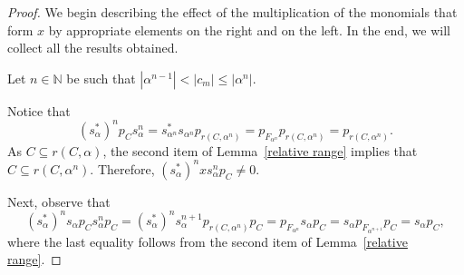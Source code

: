 \documentclass[a4paper,12pt]{amsart}
\theoremstyle{definition}
\theoremstyle{remark}
\numberwithin{equation}{section}
\newcommand{\N}{\mathbb{N}}
\begin{document}
\begin{proof}
We begin describing the effect of the multiplication of the monomials that form $x$ by appropriate elements on the right and on the left. In the end, we will collect all the results obtained. 

Let $n\in \N$ be such that $|\alpha^{n-1}|<|c_m|\leq |\alpha^n|$.

Notice that $$(s_\alpha^*)^np_C s_\alpha^n=s_{\alpha^n}^* s_{\alpha^n}p_{r(C,\alpha^n)}=p_{F_{\alpha^n}}p_{r(C,\alpha^n)}=p_{r(C,\alpha^n)}.$$ 
As $C\subseteq r(C,\alpha)$, the second item of Lemma~\ref{relative range} implies that $C\subseteq r(C,\alpha^n)$. Therefore, $(s_{\alpha}^*)^n xs_\alpha^n p_C \neq 0$.

Next, observe that 
$$(s_\alpha^*)^ns_\alpha p_C s_\alpha^n p_C=(s_\alpha^*)^ns_\alpha^{n+1}p_{r(C,\alpha^n)}p_C=p_{F_{\alpha^n}}s_{\alpha}p_C=s_\alpha p_{F_{\alpha^{n+1}}}p_C=s_\alpha p_C,$$
where the last equality follows from the second item of Lemma~\ref{relative range}.


\end{proof}
\end{document}
